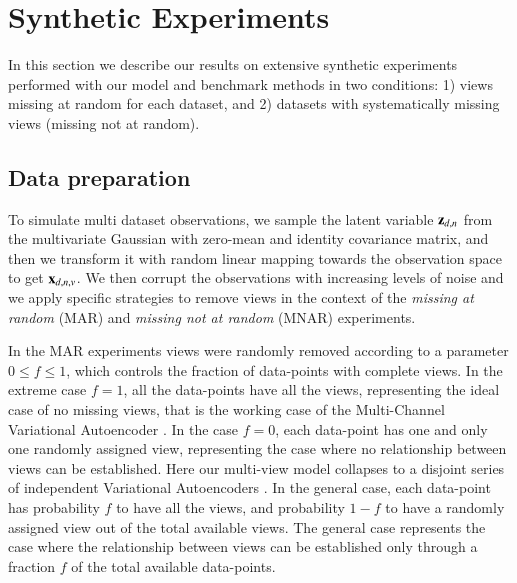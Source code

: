 \section{Synthetic Experiments}
\label{sec:synth}

In this section we describe our results on extensive synthetic experiments performed with our model and benchmark methods in two conditions:
1) views missing at random for each dataset,
and 2) datasets with systematically missing views (missing not at random).

\subsection{Data preparation}

To simulate multi dataset observations, we sample the latent variable $\mathbf{z}_{d,n}$ from the multivariate Gaussian with zero-mean and identity covariance matrix, and then we transform it with random linear mapping towards the observation space to get $\mathbf{x}_{d,n,v}$.
We then corrupt the observations with increasing levels of noise
and we apply specific strategies to remove views in the context of the \textit{missing at random} (MAR) and \textit{missing not at random} (MNAR) experiments.

In the MAR experiments views were randomly removed according to a parameter $0 \leq f \leq 1$, which controls the fraction of data-points with complete views.
In the extreme case $f=1$, all the data-points have all the views, representing the ideal case of no missing views, that is the working case of the Multi-Channel Variational Autoencoder \citep{Antelmi2019}.
In the case $f=0$, each data-point has one and only one randomly assigned view, representing the case where no relationship between views can be established.
Here our multi-view model collapses to a disjoint series of independent Variational Autoencoders \citep{Kingma2013, Rezende2014}.
In the general case, each data-point has probability $f$ to have all the views, and probability $1-f$ to have a randomly assigned view out of the total available views.
The general case represents the case where the relationship between views can be established only through a fraction $f$ of the total available data-points.

